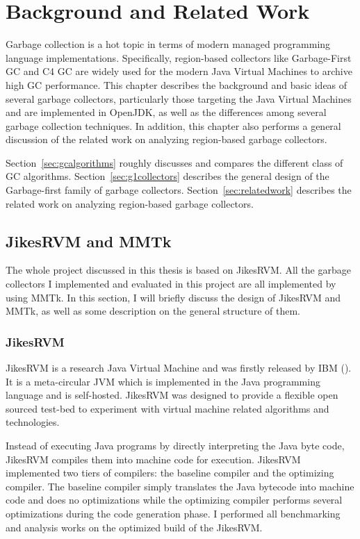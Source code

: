 \chapter{Background and Related Work}
\label{cha:background}

Garbage collection is a hot topic in terms of modern managed programming language
implementations. Specifically, region-based collectors like Garbage-First GC and
C4 GC are widely used for the modern Java Virtual Machines to archive high GC performance.
This chapter describes the background and basic ideas of several garbage collectors,
particularly those targeting the Java Virtual Machines and are implemented in OpenJDK,
as well as the differences among several garbage collection techniques.
In addition, this chapter also performs a general discussion of the related work
on analyzing region-based garbage collectors.

Section~\ref{sec:gcalgorithms} roughly discusses and compares the different class of GC algorithms.
Section~\ref{sec:g1collectors} describes the general design of the Garbage-first family of garbage collectors.
Section~\ref{sec:relatedwork} describes the related work on analyzing region-based garbage collectors.

\section{JikesRVM and MMTk}

The whole project discussed in this thesis is based on JikesRVM. All the garbage collectors
I implemented and evaluated in this project are all implemented by using MMTk.
In this section, I will briefly discuss the design of JikesRVM and MMTk,
as well as some description on the general structure of them.

\subsection{JikesRVM}

JikesRVM is a research Java Virtual Machine and was firstly released by IBM (\cite{alpern2005jikes}). It is a meta-circular JVM
which is implemented in the Java programming language and is self-hosted.
JikesRVM was designed to provide a flexible open sourced test-bed to
experiment with virtual machine related algorithms and technologies.

Instead of executing Java programs by directly interpreting the Java byte code,
JikesRVM compiles them into machine code for execution.
JikesRVM implemented two tiers of compilers: the baseline compiler and the optimizing compiler.
The baseline compiler simply translates the Java bytecode into machine code and does no
optimizations while the optimizing compiler performs several optimizations during the
code generation phase. I performed all benchmarking and analysis works on the
optimized build of the JikesRVM.

